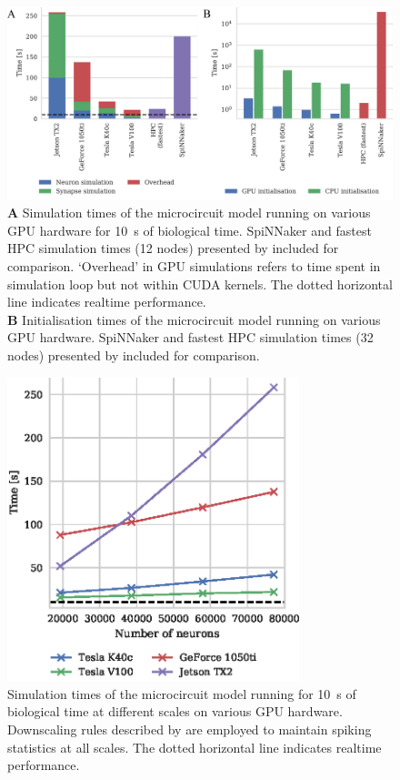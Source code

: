 \documentclass[utf8]{frontiersSCNS} %
\begin{document}
\begin{figure}
    \begin{center}
        \includegraphics[width=180mm]{figures/microcircuit_performance_merged}
    \end{center}
    \caption{\textbf{A} Simulation times of the microcircuit model running on various GPU hardware for \SI{10}{\second} of biological time.
    SpiNNaker and fastest HPC simulation times (12 nodes) presented by \citet{VanAlbada2018} included for comparison.
    `Overhead' in GPU simulations refers to time spent in simulation loop but not within CUDA kernels.
    The dotted horizontal line indicates realtime performance.\\
    \textbf{B} Initialisation times of the microcircuit model running on various GPU hardware.
    SpiNNaker and fastest HPC simulation times (32 nodes) presented by \citet{VanAlbada2018} included for comparison.}
    \label{fig:microcircuit_performance}
\end{figure}

\begin{figure}
    \begin{center}
        \includegraphics[width=85mm]{figures/microcircuit_scaling}
    \end{center}
    \caption{Simulation times of the microcircuit model running for \SI{10}{\second} of biological time at different scales on various GPU hardware.
    Downscaling rules described by \citet{VanAlbada2015} are employed to maintain spiking statistics at all scales.
    The dotted horizontal line indicates realtime performance.}
    \label{fig:microcircuit_performance_scaling}
\end{figure}
\end{document}
